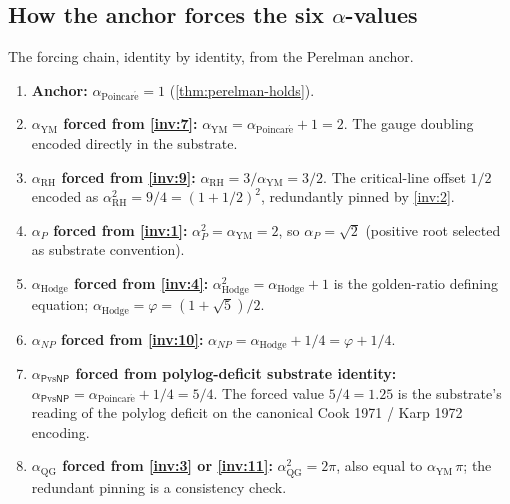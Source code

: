 \documentclass[11pt,a4paper]{article}
\theoremstyle{plain}
\theoremstyle{definition}
\begin{document}
\subsection{How the anchor forces the six $\alpha$-values}
\label{sec:forcing-chain}

The forcing chain, identity by identity, from the Perelman anchor.

\begin{enumerate}[leftmargin=*,nosep]
\item \textbf{Anchor:} $\alpha_{\mathrm{Poincar\acute e}} = 1$
  (\cref{thm:perelman-holds}).

\item \textbf{$\alpha_{\mathrm{YM}}$ forced from \eqref{inv:7}:}
  $\alpha_{\mathrm{YM}} = \alpha_{\mathrm{Poincar\acute e}} + 1 = 2$.
  The gauge doubling encoded directly in the substrate.

\item \textbf{$\alpha_{\mathrm{RH}}$ forced from \eqref{inv:9}:}
  $\alpha_{\mathrm{RH}} = 3 / \alpha_{\mathrm{YM}} = 3 / 2$.
  The critical-line offset $1/2$ encoded as
  $\alpha_{\mathrm{RH}}^{2} = 9/4 = (1 + 1/2)^{2}$, redundantly
  pinned by \eqref{inv:2}.

\item \textbf{$\alpha_{P}$ forced from \eqref{inv:1}:}
  $\alpha_{P}^{2} = \alpha_{\mathrm{YM}} = 2$, so
  $\alpha_{P} = \sqrt{2}$ (positive root selected as substrate
  convention).

\item \textbf{$\alpha_{\mathrm{Hodge}}$ forced from \eqref{inv:4}:}
  $\alpha_{\mathrm{Hodge}}^{2} = \alpha_{\mathrm{Hodge}} + 1$
  is the golden-ratio defining equation;
  $\alpha_{\mathrm{Hodge}} = \varphi = (1 + \sqrt{5})/2$.

\item \textbf{$\alpha_{NP}$ forced from \eqref{inv:10}:}
  $\alpha_{NP} = \alpha_{\mathrm{Hodge}} + 1/4 = \varphi + 1/4$.

\item \textbf{$\alpha_{\mathsf{P}\mathrm{vs}\mathsf{NP}}$ forced
  from polylog-deficit substrate identity:}
  $\alpha_{\mathsf{P}\mathrm{vs}\mathsf{NP}} = \alpha_{\mathrm{Poincar\acute e}}
  + 1/4 = 5/4$. The forced value
  $5/4 = 1.25$ is the substrate's reading of the polylog deficit
  on the canonical Cook 1971 / Karp 1972 encoding.

\item \textbf{$\alpha_{\mathrm{QG}}$ forced from \eqref{inv:3} or
  \eqref{inv:11}:} $\alpha_{\mathrm{QG}}^{2} = 2\pi$, also equal to
  $\alpha_{\mathrm{YM}}\,\pi$; the redundant pinning is a
  consistency check.


\end{enumerate}
\end{document}
